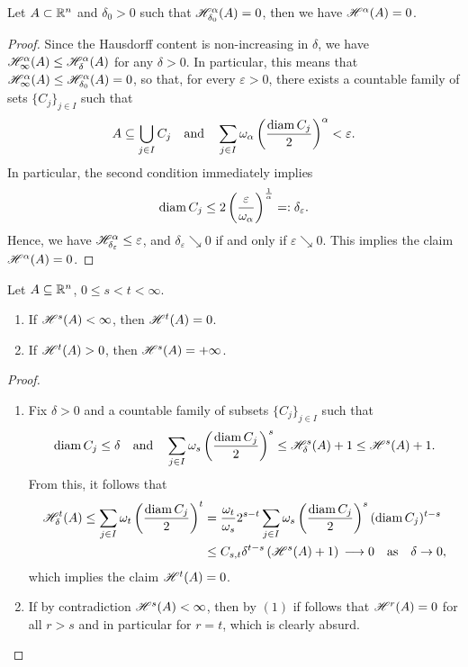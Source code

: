 \begin{lemma}
Let $A \subset \mathbb{R}^n$ and $\delta_{0} > 0$ such that $\mathscr{H}^{\alpha}_{\delta_{0}}(A) = 0$,
then we have $\mathscr{H}^{\alpha}(A) = 0$.
\end{lemma}

\begin{proof}
Since the Hausdorff content is non-increasing in $\delta$, we have $\mathscr{H}^{\alpha}_\infty(A) \le \mathscr{H}^{\alpha}_\delta(A)$ for any $\delta > 0$. In particular, this means that $\mathscr{H}^{\alpha}_{\infty}(A) \le \mathscr{H}^{\alpha}_{\delta_{0}}(A) = 0$, so that, for every $\varepsilon > 0$, there exists a countable family of sets $\{C_j\}_{j\in I}$ such that 
\[
A \subseteq
\bigcup_{j\in I} C_j 
\quad \text{and} \quad
\sum_{j\in I} \omega_\alpha \left(\frac{\operatorname{diam} C_j}{2} \right)^\alpha <
\varepsilon.
\]
In particular, the second condition immediately implies $$\operatorname{diam} C_j
\leq 2 \left(\frac{\varepsilon}{\omega_\alpha}\right)^{\frac{1}{\alpha}} = :
\delta_\varepsilon.$$ 
Hence, we have $\mathscr{H}^{\alpha}_{\delta_\varepsilon} \leq
\varepsilon$, and $\delta_\varepsilon \searrow 0$ if and only if $\varepsilon \searrow
0$. This implies the claim $\mathscr{H}^{\alpha}(A) = 0$.
\end{proof}

\begin{proposition} \label{prop:prop_Hausdorff_dim}
Let $A \subseteq \mathbb{R}^n$, $0 \leq s < t < \infty$.
\begin{enumerate}[(1)]
\item If $\mathscr{H}^{s}(A) < \infty$, then $\mathscr{H}^{t}(A) = 0$. 
\item If $\mathscr{H}^{t}(A) > 0$, then $\mathscr{H}^{s}(A) = +\infty$.
\end{enumerate}
\end{proposition}
\begin{proof}
\begin{enumerate}[(1)]
\item Fix $\delta > 0$ and a countable family of subsets 
$\{C_j\}_{j\in I}$ such that 
\[
\operatorname{diam} C_j \leq \delta 
\quad \text{and} \quad
\sum_{j\in I} \omega_s
\left(\frac{\operatorname{diam} C_j}{2}\right)^s \leq \mathscr{H}^{s}_\delta(A) + 1 \leq
\mathscr{H}^{s}(A) + 1.
\]
From this, it follows that
\[
\begin{aligned}
\mathscr{H}^{t}_\delta(A) \leq \sum_{j\in I} \omega_t \left(\frac{\operatorname{diam} C_j}{2}\right)^t 
&= \frac{\omega_t}{\omega_s} 2^{s-t} \sum_{j\in I} \omega_s 
\left(\frac{\operatorname{diam} C_j}{2} \right)^s (\operatorname{diam} C_j)^{t-s}
\\ &\leq C_{s,t} \delta^{t-s} \left(\mathscr{H}^{s}(A) +1 \right) 
\, \longrightarrow 0 \quad \text{as} \quad \delta \to 0,
\end{aligned}
\]
which implies the claim $\mathscr{H}^{t}(A) = 0$.
\item If by contradiction $\mathscr{H}^{s}(A) < \infty$, then by $(1)$ if follows
that $\mathscr{H}^{r}(A) = 0$ for all $ r > s$ and in particular for $r = t$, which is clearly absurd.
\end{enumerate}
\end{proof}

